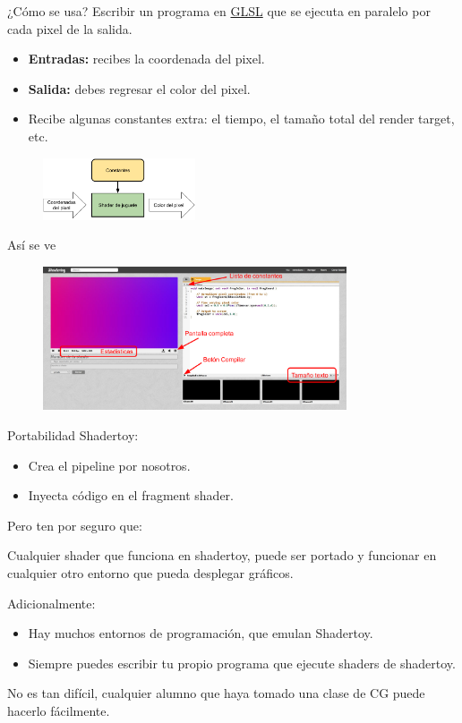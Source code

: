 \begin{frame}{¿Cómo se usa?}
Escribir un programa en \href{https://www.khronos.org/opengl/wiki/Core_Language_(GLSL)}{GLSL} que se ejecuta en paralelo por cada pixel de la salida.
\begin{itemize}
    \item \textbf{Entradas:} recibes la coordenada del pixel.
    \item \textbf{Salida:} debes regresar el color del pixel.
    \item Recibe algunas constantes extra: el tiempo, el tamaño total del render target, etc.
\end{itemize}
\begin{figure}[htp]
  \centering
  \includegraphics[width=0.4\textwidth]{img/SimpleShaderToy}
\end{figure}
\end{frame}

\begin{frame}{Así se ve}
\begin{figure}[htp]
  \centering
  \includegraphics[width=0.8\textwidth]{img/ShaderToyUI}
\end{figure}
\end{frame}

\begin{frame}{Portabilidad}
Shadertoy:
\begin{itemize}
    \item Crea el pipeline por nosotros.
    \item Inyecta código en el fragment shader.
\end{itemize}
Pero ten por seguro que:
\begin{block}{}
    Cualquier shader que funciona en shadertoy, puede ser \alert{portado} y funcionar en cualquier otro entorno que pueda desplegar gráficos.
\end{block}
Adicionalmente:
\begin{itemize}{}
    \item Hay muchos entornos de programación, que emulan Shadertoy.
    \item Siempre puedes escribir tu propio programa que ejecute shaders de shadertoy.
\end{itemize}
\begin{block}{}
    No es tan difícil, cualquier alumno que haya tomado una clase de CG puede hacerlo fácilmente.
\end{block}
\end{frame}

